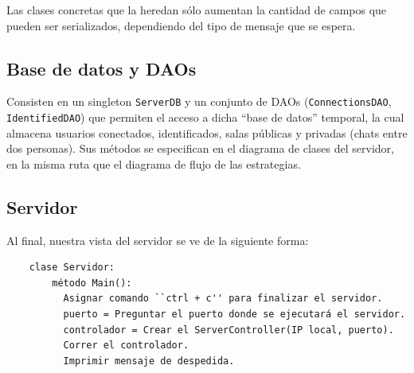 Las clases concretas que la heredan sólo aumentan la cantidad de campos que pueden ser serializados, dependiendo del tipo de mensaje que se espera.

\subsection{Base de datos y DAOs}
Consisten en un singleton \texttt{ServerDB} y un conjunto de DAOs (\texttt{ConnectionsDAO}, \texttt{IdentifiedDAO}) que permiten el acceso a dicha ``base de datos'' temporal, la cual almacena usuarios conectados, identificados, salas públicas y privadas (chats entre dos personas). Sus métodos se especifican en el diagrama de clases del servidor, en la misma ruta que el diagrama de flujo de las estrategias.

\subsection{Servidor}

 Al final, nuestra vista del servidor se ve de la siguiente forma:
 
\begin{verbatim}
	clase Servidor:
	    método Main():
	      Asignar comando ``ctrl + c'' para finalizar el servidor.
	      puerto = Preguntar el puerto donde se ejecutará el servidor.
	      controlador = Crear el ServerController(IP local, puerto).
	      Correr el controlador.
	      Imprimir mensaje de despedida.
\end{verbatim}

